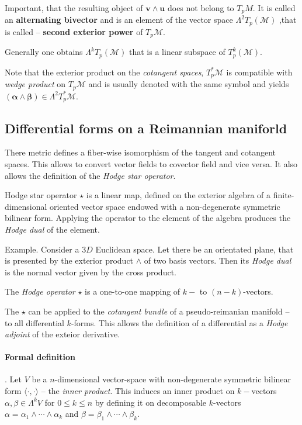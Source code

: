 Important, that the resulting object of $\boldsymbol{v}\wedge\boldsymbol{u}$ does not belong to $T_p M$. It is called an \textbf{alternating bivector} and is an element of the vector space $\Lambda^2 T_p (\mathcal{M})$ ,that is called -- \textbf{second exterior power} of $T_p \mathcal{M}$.

Generally one obtains $\Lambda^k T_p (\mathcal{M})$ that is a linear subspace of $T_p ^k (\mathcal{M})$.

Note that the exterior product on the \textit{cotangent spaces}, $T_p ^* \mathcal{M}$ is compatible with \textit{wedge product} on $T_p\mathcal{M}$ and is usually denoted with the same symbol and yields
$(\boldsymbol{\alpha}\wedge\boldsymbol{\beta})\in\Lambda^2 T_p ^* \mathcal{M}$.


\subsection{Differential forms on a Reimannian maniforld}

There metric defines a fiber-wise isomorphism of the tangent and cotangent spaces. This allows to convert vector fields to covector field and vice versa. It also allows the definition of the \textit{Hodge star operator}.

Hodge star operator $\star$ is a linear map, defined on the exterior algebra of a finite-dimensional oriented vector space endowed with a non-degenerate symmetric bilinear form. Applying the operator to the element of the algebra produces the \textit{Hodge dual} of the element.

Example. Consider a $3D$ Euclidean space. Let there be an orientated plane, that is presented by the exterior product $\wedge$ of two basis vectors. Then its \textit{Hodge dual} is the normal vector given by the cross product. 

The \textit{Hodge operator} $\star$ is a one-to-one mapping of $k-$ to $(n-k)$-vectors.

The $\star$ can be applied to the \textit{cotangent bundle} of a pseudo-reimanian manifold -- to all differential $k$-forms. This allows the definition of a differential as a \textit{Hodge adjoint} of the exteior derivative. 

\paragraph{Formal definition}. Let $V$ be a $n$-dimensional vector-space with non-degenerate symmetric bilinear form $\langle\cdot,\cdot\rangle$ -- the \textit{inner product}. 
This induces an inner product on $k-$vectors $\alpha,\beta\in\Lambda^k V$ for $0\leq k \leq n$ by defining it on decomposable $k$-vectors $\alpha = \alpha_1\wedge\cdots\wedge\alpha_k$ and $\beta=\beta_1\wedge\cdots\wedge\beta_k$.

